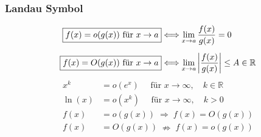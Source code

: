 \subsubsection{Landau Symbol}
    \vspace{-1em}
    \begin{align*}
        \fbox{$f(x) = o(g(x)) \textrm{ für } x \to a$} &\Longleftrightarrow \lim_{x \to a} \frac{f(x)}{g(x)} = 0\\[0.5em]
        \fbox{$f(x) = O(g(x)) \textrm{ für } x \to a$}  &\Longleftrightarrow \lim_{x \to a} \left\lvert\frac{f(x)}{g(x)}\right\rvert \leq A \in \mathbb{R}
    \end{align*}
        \begin{align*}
            x^k &= o(e^x) \quad \textrm{ für } x \to \infty, \quad k \in \mathbb{R}\\
            \ln(x) &= o(x^k) \quad \textrm{ für } x \to \infty, \quad k > 0\\[0.5em]
            f(x) &= o(g(x)) \; \Rightarrow \; f(x) = O(g(x))\\
        f(x) &= O(g(x)) \; \nRightarrow \; f(x) = o(g(x))
        \end{align*}